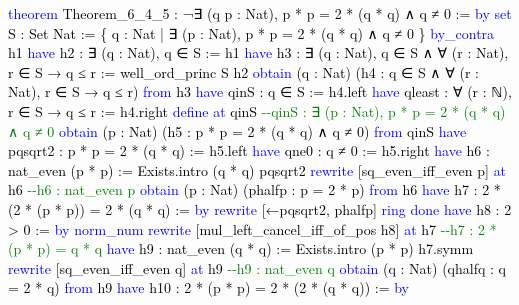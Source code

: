 \documentclass[
  letterpaper,
  DIV=11,
  numbers=noendperiod]{scrreprt}
\newenvironment{Shaded}{\begin{snugshade}}{\end{snugshade}}
\newcommand{\CommentTok}[1]{\textcolor[rgb]{0.37,0.37,0.37}{#1}}
\newcommand{\KeywordTok}[1]{\textcolor[rgb]{0.00,0.23,0.31}{#1}}
\newcommand{\NormalTok}[1]{\textcolor[rgb]{0.00,0.23,0.31}{#1}}
\renewcommand{\NormalTok}[1]{\textcolor[HTML]{000000}{#1}}
\renewcommand{\KeywordTok}[1]{\textcolor[HTML]{0000FF}{#1}}
\renewcommand{\CommentTok}[1]{\textcolor[HTML]{008000}{#1}}
\theoremstyle{remark}
\begin{document}
\begin{Shaded}
\begin{Highlighting}[]
\KeywordTok{theorem}\NormalTok{ Theorem\_6\_4\_5 :}
\NormalTok{    ¬∃ (q p : Nat), p * p = 2 * (q * q) ∧ q ≠ 0 := }\KeywordTok{by}
  \KeywordTok{set}\NormalTok{ S : Set Nat :=}
\NormalTok{    \{ q : Nat | ∃ (p : Nat), p * p = 2 * (q * q) ∧ q ≠ 0 \}}
  \KeywordTok{by\_contra}\NormalTok{ h1}
  \KeywordTok{have}\NormalTok{ h2 : ∃ (q : Nat), q ∈ S := h1}
  \KeywordTok{have}\NormalTok{ h3 : ∃ (q : Nat), q ∈ S ∧ ∀ (r : Nat), r ∈ S → q ≤ r :=}
\NormalTok{    well\_ord\_princ S h2}
  \KeywordTok{obtain}\NormalTok{ (q : Nat) (h4 : q ∈ S ∧ ∀ (r : Nat), r ∈ S → q ≤ r) }\KeywordTok{from}\NormalTok{ h3}
  \KeywordTok{have}\NormalTok{ qinS : q ∈ S := h4.left}
  \KeywordTok{have}\NormalTok{ qleast : ∀ (r : ℕ), r ∈ S → q ≤ r := h4.right}
  \KeywordTok{define} \KeywordTok{at}\NormalTok{ qinS     }\CommentTok{{-}{-}qinS : ∃ (p : Nat), p * p = 2 * (q * q) ∧ q ≠ 0}
  \KeywordTok{obtain}\NormalTok{ (p : Nat) (h5 : p * p = 2 * (q * q) ∧ q ≠ 0) }\KeywordTok{from}\NormalTok{ qinS}
  \KeywordTok{have}\NormalTok{ pqsqrt2 : p * p = 2 * (q * q) := h5.left}
  \KeywordTok{have}\NormalTok{ qne0 : q ≠ 0 := h5.right}
  \KeywordTok{have}\NormalTok{ h6 : nat\_even (p * p) := Exists.intro (q * q) pqsqrt2}
  \KeywordTok{rewrite}\NormalTok{ [sq\_even\_iff\_even p] }\KeywordTok{at}\NormalTok{ h6    }\CommentTok{{-}{-}h6 : nat\_even p}
  \KeywordTok{obtain}\NormalTok{ (p\textquotesingle{} : Nat) (p\textquotesingle{}halfp : p = 2 * p\textquotesingle{}) }\KeywordTok{from}\NormalTok{ h6}
  \KeywordTok{have}\NormalTok{ h7 : 2 * (2 * (p\textquotesingle{} * p\textquotesingle{})) = 2 * (q * q) := }\KeywordTok{by}
    \KeywordTok{rewrite}\NormalTok{ [←pqsqrt2, p\textquotesingle{}halfp]}
    \KeywordTok{ring}
    \KeywordTok{done}
  \KeywordTok{have}\NormalTok{ h8 : 2 \textgreater{} 0 := }\KeywordTok{by} \KeywordTok{norm\_num}
  \KeywordTok{rewrite}\NormalTok{ [mul\_left\_cancel\_iff\_of\_pos h8] }\KeywordTok{at}\NormalTok{ h7}
    \CommentTok{{-}{-}h7 : 2 * (p\textquotesingle{} * p\textquotesingle{}) = q * q}
  \KeywordTok{have}\NormalTok{ h9 : nat\_even (q * q) := Exists.intro (p\textquotesingle{} * p\textquotesingle{}) h7.symm}
  \KeywordTok{rewrite}\NormalTok{ [sq\_even\_iff\_even q] }\KeywordTok{at}\NormalTok{ h9   }\CommentTok{{-}{-}h9 : nat\_even q}
  \KeywordTok{obtain}\NormalTok{ (q\textquotesingle{} : Nat) (q\textquotesingle{}halfq : q = 2 * q\textquotesingle{}) }\KeywordTok{from}\NormalTok{ h9}
  \KeywordTok{have}\NormalTok{ h10 : 2 * (p\textquotesingle{} * p\textquotesingle{}) = 2 * (2 * (q\textquotesingle{} * q\textquotesingle{})) := }\KeywordTok{by}

\end{Highlighting}
\end{Shaded}
\end{document}
